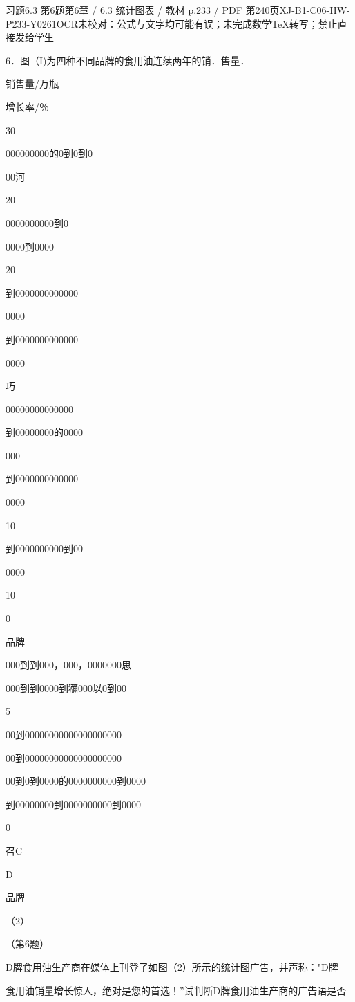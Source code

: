 \begin{bankitem}{习题6.3 第6题}{第6章 / 6.3 统计图表 / 教材 p.233 / PDF 第240页}{XJ-B1-C06-HW-P233-Y0261}{OCR未校对：公式与文字均可能有误；未完成数学TeX转写；禁止直接发给学生}
\begin{ocrdraft}
\par
6．图（I)为四种不同品牌的食用油连续两年的销．售量．
\par
销售量/万瓶
\par
增长率/％
\par
30
\par
000000000的0到0到0
\par
00河
\par
20
\par
0000000000到0
\par
0000到0000
\par
20
\par
到0000000000000
\par
0000
\par
到0000000000000
\par
0000
\par
巧
\par
00000000000000
\par
到00000000的0000
\par
000
\par
到0000000000000
\par
0000
\par
10
\par
到0000000000到00
\par
0000
\par
10
\par
0
\par
品牌
\par
000到到000，000，0000000思
\par
000到到0000到獼000以0到00
\par
5
\par
00到00000000000000000000
\par
00到00000000000000000000
\par
00到0到0000的0000000000到0000
\par
到00000000到0000000000到0000
\par
0
\par
召C
\par
D
\par
品牌
\par
（2）
\par
（第6题）
\par
D牌食用油生产商在媒体上刊登了如图（2）所示的统计图广告，并声称："D牌
\par
食用油销量增长惊人，绝对是您的首选！”试判断D牌食用油生产商的广告语是否
\end{ocrdraft}
\end{bankitem}
